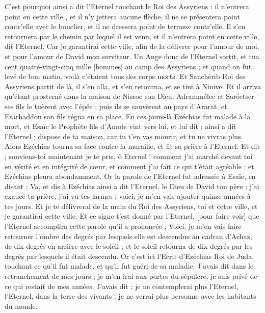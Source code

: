 \begin{multicols}{2}
C'est pourquoi ainsi a dit l'Eternel touchant le Roi des Assyriens ; il n'entrera point en cette ville , et il n'y jettera aucune flèche, il ne se présentera point contr'elle avec le bouclier, et il ne dressera point de terrasse contr'elle.
Il s'en retournera par le chemin par lequel il est venu, et il n'entrera point en cette ville, dit l'Eternel.
Car je garantirai cette ville, afin de la délivrer pour l'amour de moi, et pour l'amour de David mon serviteur.
Un Ange donc de l'Eternel sortit, et tua cent quatre-vingt-cinq mille [hommes] au camp des Assyriens ; et quand on fut levé de bon matin, voilà c'étaient tous des corps morts.
Et Sanchérib Roi des Assyriens partit de là, il s'en alla, et s'en retourna, et se tint à Ninive.
Et il arriva qu'étant prosterné dans la maison de Nisroc son Dieu, Adrammélec et Saréetser ses fils le tuèrent avec l'épée ; puis ils se sauvèrent au pays d'Ararat, et Esarhaddon son fils régna en sa place.
\VerseOne{}En ces jours-là Ezéchias fut malade à la mort, et Esaïe le Prophète fils d'Amots vint vers lui, et lui dit ; ainsi a dit l'Eternel ; dispose de ta maison, car tu t'en vas mourir, et tu ne vivras plus.
Alors Ezéchias tourna sa face contre la muraille, et fit sa prière à l'Eternel.
Et dit ; souviens-toi maintenant je te prie, ô Eternel ! comment j'ai marché devant toi en vérité et en intégrité de cœur, et comment j'ai fait ce qui t'était agréable ; et Ezéchias pleura abondamment.
Or la parole de l'Eternel fut adressée à Esaïe, en disant ;
Va, et dis à Ezéchias ainsi a dit l'Eternel, le Dieu de David ton père ; j'ai exaucé ta prière, j'ai vu tes larmes ; voici, je m'en vais ajouter quinze années à tes jours.
Et je te délivrerai de la main du Roi des Assyriens, toi et cette ville, et je garantirai cette ville.
Et ce signe t'est donné par l'Eternel, [pour faire voir] que l'Eternel accomplira cette parole qu'il a prononcée ;
Voici, je m'en vais faire retourner l'ombre des degrés par lesquels elle est descendue au cadran d'Achaz, de dix degrés en arrière avec le soleil ; et le soleil retourna de dix degrés par les degrés par lesquels il était descendu.
Or c'est ici l'Ecrit d'Ezéchias Roi de Juda, touchant ce qu'il fut malade, et qu'il fut guéri de sa maladie.
J'avais dit dans le retranchement de mes jours ; je m'en irai aux portes du sépulcre, je suis privé de ce qui restait de mes années.
J'avais dit ; je ne contemplerai plus l'Eternel, l'Eternel, dans la terre des vivants ; je ne verrai plus personne avec les habitants du monde.

\end{multicols}
